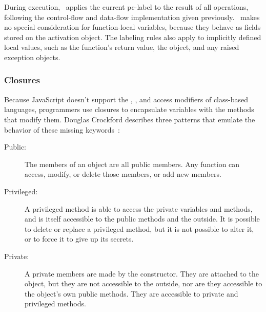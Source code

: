 During execution, \FlowCore\ applies the current pc-label to the result of all operations, following the control-flow and data-flow implementation given previously.
\FlowCore\ makes no special consideration for function-local variables, because they behave as fields stored on the activation object.
The labeling rules also apply to implicitly defined local values, such as the function's return value, the  object, and any raised exception objects.

\begin{comment}
function foo() {
  console.log(arguments.caller)        // undefined
  console.log(arguments.length)        // length of the argumets
  console.log(Function.caller)         // null
  console.log(foo.caller)              // code of parent function
  console.log(arguments.callee.caller) // code of parent function
  console.log(arguments.callee)        // code of self
  console.log(typeof arguments)        // object
}

foo(1,2,3,4)
\end{comment}

\subsubsection{Closures}


Because JavaScript doesn't support the , , and  access modifiers of class-based languages, programmers use closures to encapsulate variables with the methods that modify them.
Douglas Crockford describes three patterns that emulate the behavior of these missing keywords~\cite{crockford+08}:

\begin{description}
  \item[Public:]
    The members of an object are all public members. Any function can access, modify, or delete those members, or add new members.
  \item[Privileged:]
    A privileged method is able to access the private variables and methods, and is itself accessible to the public methods and the outside.
    It is possible to delete or replace a privileged method, but it is not possible to alter it, or to force it to give up its secrets.
  \item[Private:]
    A private members are made by the constructor.
    They are attached to the object, but they are not accessible to the outside, nor are they accessible to the object's own public methods.
    They are accessible to private and privileged methods.
\end{description}

